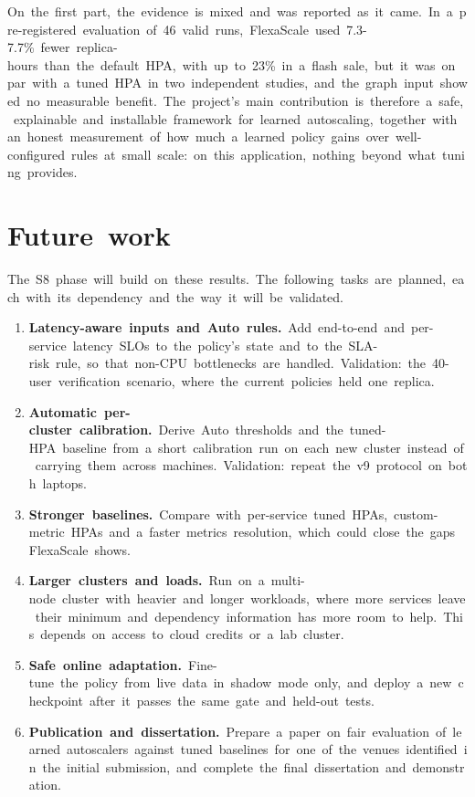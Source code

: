 \documentclass[12pt,a4paper,oneside]{report}
\begin{document}
On~the~first~part,~the~evidence~is~mixed~and~was~reported~as~it~came.~In~a~pre-registered~evaluation~of~46~valid~runs,~FlexaScale~used~7.3-7.7\%~fewer~replica-hours~than~the~default~HPA,~with~up~to~23\%~in~a~flash~sale,~but~it~was~on~par~with~a~tuned~HPA~in~two~independent~studies,~and~the~graph~input~showed~no~measurable~benefit.~The~project's~main~contribution~is~therefore~a~safe,~explainable~and~installable~framework~for~learned~autoscaling,~together~with~an~honest~measurement~of~how~much~a~learned~policy~gains~over~well-configured~rules~at~small~scale:~on~this~application,~nothing~beyond~what~tuning~provides.


\section{Future~work}

The~S8~phase~will~build~on~these~results.~The~following~tasks~are~planned,~each~with~its~dependency~and~the~way~it~will~be~validated.


\begin{enumerate}\setlength{\itemsep}{1pt}
  \item \textbf{Latency-aware~inputs~and~Auto~rules.}~Add~end-to-end~and~per-service~latency~SLOs~to~the~policy's~state~and~to~the~SLA-risk~rule,~so~that~non-CPU~bottlenecks~are~handled.~Validation:~the~40-user~verification~scenario,~where~the~current~policies~held~one~replica.
  \item \textbf{Automatic~per-cluster~calibration.}~Derive~Auto~thresholds~and~the~tuned-HPA~baseline~from~a~short~calibration~run~on~each~new~cluster~instead~of~carrying~them~across~machines.~Validation:~repeat~the~v9~protocol~on~both~laptops.
  \item \textbf{Stronger~baselines.}~Compare~with~per-service~tuned~HPAs,~custom-metric~HPAs~and~a~faster~metrics~resolution,~which~could~close~the~gaps~FlexaScale~shows.
  \item \textbf{Larger~clusters~and~loads.}~Run~on~a~multi-node~cluster~with~heavier~and~longer~workloads,~where~more~services~leave~their~minimum~and~dependency~information~has~more~room~to~help.~This~depends~on~access~to~cloud~credits~or~a~lab~cluster.
  \item \textbf{Safe~online~adaptation.}~Fine-tune~the~policy~from~live~data~in~shadow~mode~only,~and~deploy~a~new~checkpoint~after~it~passes~the~same~gate~and~held-out~tests.
  \item \textbf{Publication~and~dissertation.}~Prepare~a~paper~on~fair~evaluation~of~learned~autoscalers~against~tuned~baselines~for~one~of~the~venues~identified~in~the~initial~submission,~and~complete~the~final~dissertation~and~demonstration.
\end{enumerate}
\end{document}
